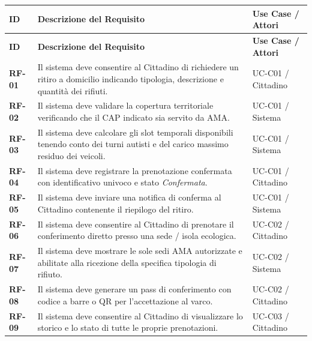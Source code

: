 \begin{center}
\renewcommand{\arraystretch}{1.3}
\begin{longtable}{|p{2cm}|p{8cm}|p{5cm}|}
\hline
\rowcolor{tableheader} \textbf{ID} & \textbf{Descrizione del Requisito} & \textbf{Use Case / Attori} \\ \hline
\endfirsthead

\hline
\rowcolor{tableheader} \textbf{ID} & \textbf{Descrizione del Requisito} & \textbf{Use Case / Attori} \\ \hline
\endhead

\textbf{RF-01} & Il sistema deve consentire al Cittadino di richiedere un ritiro a domicilio indicando tipologia, descrizione e quantità dei rifiuti. & UC-C01 / Cittadino \\ \hline

\textbf{RF-02} & Il sistema deve validare la copertura territoriale verificando che il CAP indicato sia servito da AMA. & UC-C01 / Sistema \\ \hline

\textbf{RF-03} & Il sistema deve calcolare gli slot temporali disponibili tenendo conto dei turni autisti e del carico massimo residuo dei veicoli. & UC-C01 / Sistema \\ \hline

\textbf{RF-04} & Il sistema deve registrare la prenotazione confermata con identificativo univoco e stato \textit{Confermata}. & UC-C01 / Cittadino \\ \hline

\textbf{RF-05} & Il sistema deve inviare una notifica di conferma al Cittadino contenente il riepilogo del ritiro. & UC-C01 / Sistema \\ \hline

\textbf{RF-06} & Il sistema deve consentire al Cittadino di prenotare il conferimento diretto presso una sede / isola ecologica. & UC-C02 / Cittadino \\ \hline

\textbf{RF-07} & Il sistema deve mostrare le sole sedi AMA autorizzate e abilitate alla ricezione della specifica tipologia di rifiuto. & UC-C02 / Sistema \\ \hline

\textbf{RF-08} & Il sistema deve generare un pass di conferimento con codice a barre o QR per l'accettazione al varco. & UC-C02 / Cittadino \\ \hline

\textbf{RF-09} & Il sistema deve consentire al Cittadino di visualizzare lo storico e lo stato di tutte le proprie prenotazioni. & UC-C03 / Cittadino \\ \hline


\end{longtable}
\end{center}
